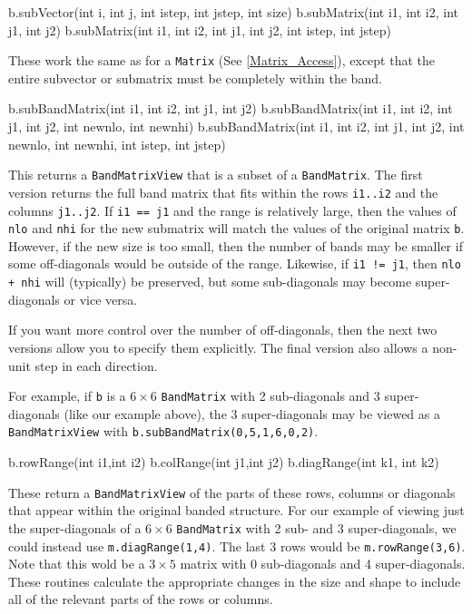\documentclass[twoside,letterpaper,11pt]{article}
\renewcommand{\tt}[1]{{\lstinline {#1}}}
\begin{document}
\begin{tmvcode}
b.subVector(int i, int j, int istep, int jstep, int size)
b.subMatrix(int i1, int i2, int j1, int j2)
b.subMatrix(int i1, int i2, int j1, int j2, int istep, int jstep)
\end{tmvcode}
These work the same as for a \tt{Matrix}
(See \ref{Matrix_Access}),
except that the entire
subvector or submatrix must be completely within the band.

\begin{tmvcode}
b.subBandMatrix(int i1, int i2, int j1, int j2)
b.subBandMatrix(int i1, int i2, int j1, int j2, int newnlo, int newnhi)
b.subBandMatrix(int i1, int i2, int j1, int j2, int newnlo, int newnhi, 
      int istep, int jstep)
\end{tmvcode}
This returns a \tt{BandMatrixView} that is a subset of a \tt{BandMatrix}.
The first version returns the full band matrix that fits within the rows
\tt{i1..i2} and the columns \tt{j1..j2}.  If \tt{i1 == j1} and the range is 
relatively large, then the values of \tt{nlo} and \tt{nhi} for the new 
submatrix will match the values of the original matrix \tt{b}.  However,
if the new size is too small, then the number of bands may be 
smaller if some off-diagonals would be outside of the range. 
Likewise, if \tt{i1 != j1}, then \tt{nlo + nhi} will (typically) be preserved, but some 
sub-diagonals may become super-diagonals or vice versa.

If you want more control over the number of off-diagonals, then
the next two versions allow you to specify them explicitly.  The final
version also allows a non-unit step in each direction.

For example, if \tt{b} is a $6 \times 6$ \tt{BandMatrix} with 2 sub-diagonals and 
3 super-diagonals
(like our example above), the 3 super-diagonals may be viewed as a \tt{BandMatrixView}
with \tt{b.subBandMatrix(0,5,1,6,0,2)}.

\begin{tmvcode}
b.rowRange(int i1,int i2)
b.colRange(int j1,int j2)
b.diagRange(int k1, int k2)
\end{tmvcode}
These return a \tt{BandMatrixView} of the parts of these rows,
columns or diagonals that
appear within the original banded structure.  For our example of viewing just
the super-diagonals of a $6 \times 6$ \tt{BandMatrix} with 2 sub- and 
3 super-diagonals, we
could instead use \tt{m.diagRange(1,4)}.  The last 3 rows would be \tt{m.rowRange(3,6)}.
Note that this wold be a $3 \times 5$ matrix with 0 sub-diagonals and 
4 super-diagonals.
These routines calculate the appropriate changes in the size and shape to include
all of the relevant parts of the rows or columns.
\end{document}
